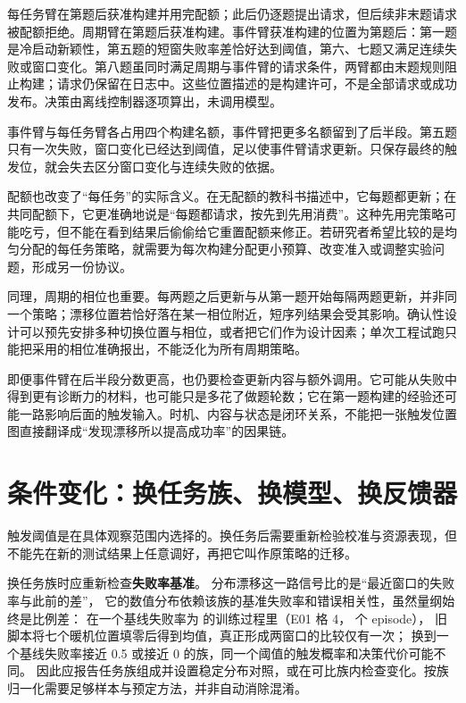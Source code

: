 每任务臂在第题后获准构建并用完配额；此后仍逐题提出请求，但后续非末题请求被配额拒绝。周期臂在第题后获准构建。事件臂获准构建的位置为第题后：第一题是冷启动新颖性，第五题的短窗失败率差恰好达到阈值，第六、七题又满足连续失败或窗口变化。第八题虽同时满足周期与事件臂的请求条件，两臂都由末题规则阻止构建；请求仍保留在日志中。这些位置描述的是构建许可，不是全部请求或成功发布。决策由离线控制器逐项算出，未调用模型。

事件臂与每任务臂各占用四个构建名额，事件臂把更多名额留到了后半段。第五题只有一次失败，窗口变化已经达到阈值，足以使事件臂请求更新。只保存最终的触发位，就会失去区分窗口变化与连续失败的依据。

配额也改变了“每任务”的实际含义。在无配额的教科书描述中，它每题都更新；在共同配额下，它更准确地说是“每题都请求，按先到先用消费”。这种先用完策略可能吃亏，但不能在看到结果后偷偷给它重置配额来修正。若研究者希望比较的是均匀分配的每任务策略，就需要为每次构建分配更小预算、改变准入或调整实验问题，形成另一份协议。

同理，周期的相位也重要。每两题之后更新与从第一题开始每隔两题更新，并非同一个策略；漂移位置若恰好落在某一相位附近，短序列结果会受其影响。确认性设计可以预先安排多种切换位置与相位，或者把它们作为设计因素；单次工程试跑只能把采用的相位准确报出，不能泛化为所有周期策略。

即便事件臂在后半段分数更高，也仍要检查更新内容与额外调用。它可能从失败中得到更有诊断力的材料，也可能只是多花了做题轮数；它在第一题构建的经验还可能一路影响后面的触发输入。时机、内容与状态是闭环关系，不能把一张触发位置图直接翻译成“发现漂移所以提高成功率”的因果链。

\section{条件变化：换任务族、换模型、换反馈器}
\label{sec:ch13-conditions}

触发阈值是在具体观察范围内选择的。换任务后需要重新检验校准与资源表现，但不能先在新的测试结果上任意调好，再把它叫作原策略的迁移。

换任务族时应重新检查\textbf{失败率基准}。
分布漂移这一路信号比的是“最近窗口的失败率与此前的差”，
它的数值分布依赖该族的基准失败率和错误相关性，虽然量纲始终是比例差：
在一个基线失败率为  的训练过程里（E01 格 4， 个 episode），
旧脚本将七个暖机位置填零后得到均值，真正形成两窗口的比较仅有一次；
换到一个基线失败率接近 0.5 或接近 0 的族，同一个阈值的触发概率和决策代价可能不同。
因此应报告任务族组成并设置稳定分布对照，或在可比族内检查变化。按族归一化需要足够样本与预定方法，并非自动消除混淆。

